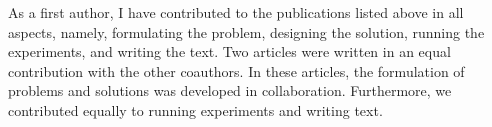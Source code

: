 As a first author, I have contributed to the publications listed above in all aspects, namely, formulating the problem, designing the solution, running the experiments, and writing the text. 
Two articles were written in an equal contribution with the other coauthors.  
In these articles, the formulation of problems and solutions was developed in collaboration. Furthermore, we contributed equally to running experiments and writing text.


